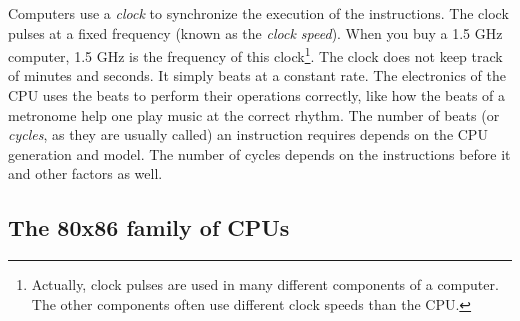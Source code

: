 Computers use a \emph{clock}  to synchronize the
execution of the  instructions.  The clock pulses at a fixed frequency
(known as the \emph{clock speed}). When you buy a 1.5 GHz computer,
1.5 GHz is the frequency of this clock\footnote{Actually, clock pulses
are used in many different components of a computer. The other
components often use different clock speeds than the CPU.}. The clock
does not keep track of minutes and seconds. It simply beats at a
constant rate. The electronics of the CPU uses the beats to perform
their operations correctly, like how the beats of a metronome help one
play music at the correct rhythm.  The number of beats (or \emph{cycles}, as they are
usually called) an instruction requires depends on the
CPU generation and model. The number of cycles depends on the
instructions before it and other factors as well.


\subsection{The 80x86 family of CPUs}

